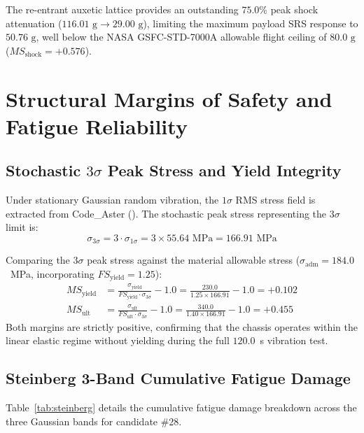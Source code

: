 \documentclass[preprint,12pt,3p]{elsarticle}
\newcommand{\code}[1]{\texttt{\detokenize{#1}}}
\begin{document}
The re-entrant auxetic lattice provides an outstanding $75.0\%$ peak shock attenuation ($116.01\text{ g} \to 29.00\text{ g}$), limiting the maximum payload SRS response to $50.76\text{ g}$, well below the NASA GSFC-STD-7000A allowable flight ceiling of $80.0\text{ g}$ ($MS_{\text{shock}} = +0.576$).

\section{Structural Margins of Safety and Fatigue Reliability}
\label{sec:stress_fatigue}

\subsection{Stochastic $3\sigma$ Peak Stress and Yield Integrity}
Under stationary Gaussian random vibration, the $1\sigma$ RMS stress field is extracted from Code\_Aster (\code{SIGM_ELNO}). The stochastic peak stress representing the $3\sigma$ limit is:
\begin{equation}
  \sigma_{3\sigma} = 3 \cdot \sigma_{1\sigma} = 3 \times 55.64\text{ MPa} = 166.91\text{ MPa}
\end{equation}

Comparing the $3\sigma$ peak stress against the material allowable stress ($\sigma_{\text{adm}} = 184.0$~MPa, incorporating $FS_{\text{yield}} = 1.25$):
\begin{align}
  MS_{\text{yield}} &= \frac{\sigma_{\text{yield}}}{FS_{\text{yield}} \cdot \sigma_{3\sigma}} - 1.0 = \frac{230.0}{1.25 \times 166.91} - 1.0 = \mathbf{+0.102} \\
  MS_{\text{ult}} &= \frac{\sigma_{\text{ult}}}{FS_{\text{ult}} \cdot \sigma_{3\sigma}} - 1.0 = \frac{340.0}{1.40 \times 166.91} - 1.0 = \mathbf{+0.455}
\end{align}
Both margins are strictly positive, confirming that the chassis operates within the linear elastic regime without yielding during the full $120.0$~s vibration test.

\subsection{Steinberg 3-Band Cumulative Fatigue Damage}
Table~\ref{tab:steinberg} details the cumulative fatigue damage breakdown across the three Gaussian bands for candidate \#28.
\end{document}
